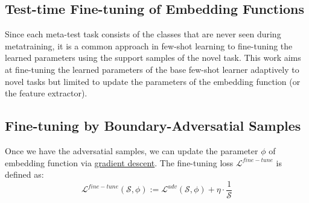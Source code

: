 \documentclass{article}
\begin{document}
\subsection{Test-time Fine-tuning of Embedding Functions}
Since each meta-test task consists of the classes that are never seen during metatraining, 
it is a common approach in few-shot learning to fine-tuning the learned parameters using the
support samples of the novel task. This work aims at fine-tuning the learned parameters of the
base few-shot learner adaptively to novel tasks but limited to update the parameters of the
embedding function (or the feature extractor). 
\subsection{Fine-tuning by Boundary-Adversatial Samples}
Once we have the adversatial samples, we can update the parameter $\phi$ of embedding function via \underline{gradient descent}. The fine-tuning loss $\mathcal{L}^{fine-tune}$ is defined as: \\
$$
\mathcal{L}^{fine-tune}(\mathcal{S}, \phi) := \mathcal{L}^{adv}(\mathcal{S}, \phi)+\eta \cdot \frac{1}{\mathcal{S}}
$$
\end{document}
